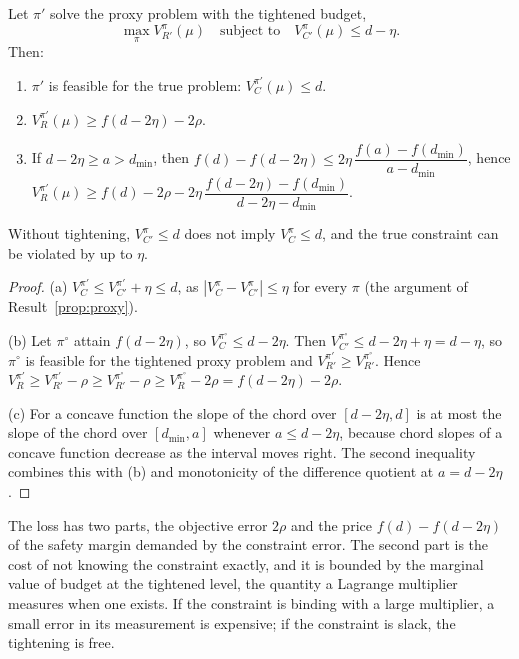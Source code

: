 \begin{newresult}\label{thm:cmdp-proxy}
Let $\pi'$ solve the proxy problem with the tightened budget,
\[
\max_\pi V_{R'}^\pi(\mu)\quad\text{subject to}\quad V_{C'}^\pi(\mu)\le d-\eta .
\]
Then:
\begin{enumerate}[nosep,label=(\alph*)]
  \item $\pi'$ is feasible for the true problem: $V_C^{\pi'}(\mu)\le d$.
  \item $V_R^{\pi'}(\mu)\ge f(d-2\eta)-2\rho$.
  \item If $d-2\eta\ge a>d_{\min}$, then $f(d)-f(d-2\eta)\le 2\eta\,\dfrac{f(a)-f(d_{\min})}{a-d_{\min}}$, hence $V_R^{\pi'}(\mu)\ge f(d)-2\rho-2\eta\,\dfrac{f(d-2\eta)-f(d_{\min})}{d-2\eta-d_{\min}}$.
\end{enumerate}
Without tightening, $V_{C'}^{\pi}\le d$ does not imply $V_C^\pi\le d$, and the true constraint can be violated by up to $\eta$.
\end{newresult}
\begin{proof}
(a) $V_C^{\pi'}\le V_{C'}^{\pi'}+\eta\le d$, as $|V_C^\pi-V_{C'}^\pi|\le\eta$ for every $\pi$ (the argument of Result~\ref{prop:proxy}).

(b) Let $\pi^\circ$ attain $f(d-2\eta)$, so $V_C^{\pi^\circ}\le d-2\eta$. Then $V_{C'}^{\pi^\circ}\le d-2\eta+\eta=d-\eta$, so $\pi^\circ$ is feasible for the tightened proxy problem and $V_{R'}^{\pi'}\ge V_{R'}^{\pi^\circ}$. Hence $V_R^{\pi'}\ge V_{R'}^{\pi'}-\rho\ge V_{R'}^{\pi^\circ}-\rho\ge V_R^{\pi^\circ}-2\rho=f(d-2\eta)-2\rho$.

(c) For a concave function the slope of the chord over $[d-2\eta,d]$ is at most the slope of the chord over $[d_{\min},a]$ whenever $a\le d-2\eta$, because chord slopes of a concave function decrease as the interval moves right. The second inequality combines this with (b) and monotonicity of the difference quotient at $a=d-2\eta$.
\end{proof}

The loss has two parts, the objective error $2\rho$ and the price $f(d)-f(d-2\eta)$ of the safety margin demanded by the constraint error. The second part is the cost of not knowing the constraint exactly, and it is bounded by the marginal value of budget at the tightened level, the quantity a Lagrange multiplier measures when one exists. If the constraint is binding with a large multiplier, a small error in its measurement is expensive; if the constraint is slack, the tightening is free.

